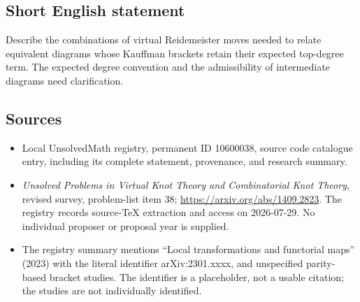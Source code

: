 \documentclass[11pt]{article}
\begin{document}
\subsection{Short English statement}
Describe the combinations of virtual Reidemeister moves needed to relate equivalent diagrams whose Kauffman brackets retain their expected top-degree term. The expected degree convention and the admissibility of intermediate diagrams need clarification.
\subsection{Sources}
\begin{itemize}
\item Local UnsolvedMath registry, permanent ID 10600038, source code catalogue entry, including its complete statement, provenance, and research summary.
\item \emph{Unsolved Problems in Virtual Knot Theory and Combinatorial Knot Theory}, revised survey, problem-list item 38; \url{https://arxiv.org/abs/1409.2823}. The registry records source-TeX extraction and access on 2026-07-29. No individual proposer or proposal year is supplied.
\item The registry summary mentions ``Local transformations and functorial maps'' (2023) with the literal identifier arXiv:2301.xxxx, and unspecified parity-based bracket studies. The identifier is a placeholder, not a usable citation; the studies are not individually identified.
\end{itemize}
\end{document}
